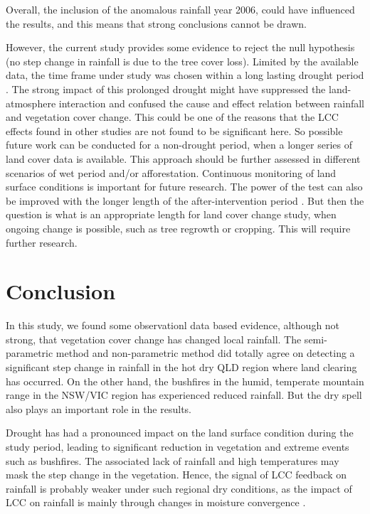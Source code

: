 \documentclass[onecolumn,referee]{svjour3}
\begin{document}
Overall, the inclusion of the anomalous rainfall year 2006, could have influenced the results, and this means that strong conclusions cannot be drawn.

However, the current study provides some evidence to reject the null hypothesis (no step change in rainfall is due to the tree cover loss). Limited by the available data, the time frame under study was chosen within a long lasting drought period \citep{Holper2011}. The strong impact of this prolonged drought might have suppressed the land-atmosphere interaction and confused the cause and effect relation between rainfall and vegetation cover change. This could be one of the reasons that the LCC effects found in other studies \citep[e.g.]{Gorgen2006,McAlpine2007} are not found to be significant here. So possible future work can be conducted for a non-drought period, when a longer series of land cover data is available. This approach should be further assessed in different scenarios of wet period and/or afforestation. Continuous monitoring of land surface conditions is important for future research. The power of the test can also be improved with the longer length of the after-intervention period \citep{Hirsch1985}. But then the question is what is an appropriate length for land cover change study, when ongoing change is possible, such as tree regrowth or cropping. This will require further research.

\section{Conclusion}

In this study, we found some observationl data based evidence, although not strong, that vegetation cover change has changed local rainfall. The semi-parametric method and non-parametric method did totally agree on detecting a significant step change in rainfall in the hot dry QLD region where land clearing has occurred. On the other hand, the bushfires in the humid, temperate mountain range in the NSW/VIC region has experienced reduced rainfall. But the dry spell also plays an important role in the results. 

Drought has had a pronounced impact on the land surface condition during the study period, leading to significant reduction in vegetation and extreme events such as bushfires. The associated lack of rainfall and high temperatures may mask the step change in the vegetation. Hence, the signal of LCC feedback on rainfall is probably weaker under such regional dry conditions, as the impact of LCC on rainfall is mainly through changes in moisture convergence \citep{Gorgen2006,Pitman2007}.
\end{document}

